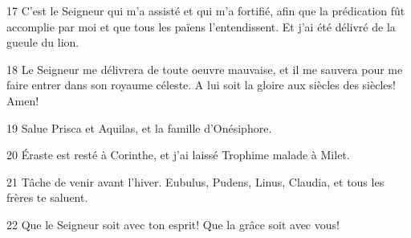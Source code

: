 \par 17 C'est le Seigneur qui m'a assisté et qui m'a fortifié, afin que la prédication fût accomplie par moi et que tous les païens l'entendissent. Et j'ai été délivré de la gueule du lion.
\par 18 Le Seigneur me délivrera de toute oeuvre mauvaise, et il me sauvera pour me faire entrer dans son royaume céleste. A lui soit la gloire aux siècles des siècles! Amen!
\par 19 Salue Prisca et Aquilas, et la famille d'Onésiphore.
\par 20 Éraste est resté à Corinthe, et j'ai laissé Trophime malade à Milet.
\par 21 Tâche de venir avant l'hiver. Eubulus, Pudens, Linus, Claudia, et tous les frères te saluent.
\par 22 Que le Seigneur soit avec ton esprit! Que la grâce soit avec vous!


